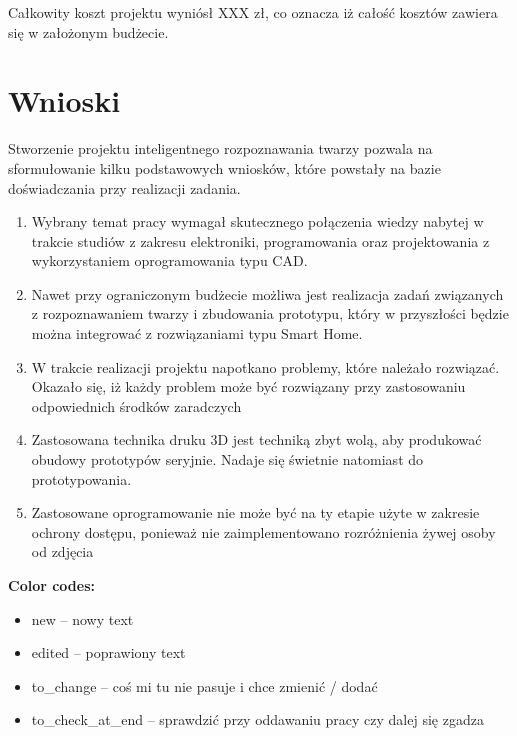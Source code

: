 \documentclass[a4paper,12pt,reqno]{article}
\begin{document}
Całkowity koszt projektu wyniósł \textcolor{to_check_at_end}{XXX} zł, co oznacza iż całość kosztów zawiera się w założonym budżecie.

\newpage
\section{Wnioski} \label{section:wnioski}
Stworzenie projektu inteligentnego rozpoznawania twarzy pozwala na sformułowanie kilku podstawowych wniosków, które powstały na bazie doświadczania przy realizacji zadania.

\begin{enumerate}
\item Wybrany temat pracy wymagał skutecznego połączenia wiedzy nabytej w trakcie studiów z zakresu elektroniki, programowania oraz projektowania z wykorzystaniem oprogramowania typu CAD.
\item Nawet przy ograniczonym budżecie możliwa jest realizacja zadań związanych z rozpoznawaniem twarzy i zbudowania prototypu, który w przyszłości będzie można integrować z rozwiązaniami typu Smart Home.
\item W trakcie realizacji projektu napotkano problemy, które należało rozwiązać. Okazało się, iż każdy problem może być rozwiązany przy zastosowaniu odpowiednich środków zaradczych
\item Zastosowana technika druku 3D jest techniką zbyt wolą, aby produkować obudowy prototypów seryjnie. Nadaje się świetnie natomiast do prototypowania.
\item Zastosowane oprogramowanie nie może być na ty etapie użyte w zakresie ochrony dostępu, ponieważ nie zaimplementowano rozróżnienia żywej osoby od zdjęcia
\end{enumerate}

\newpage




\newpage

\cite{prototyp3dzalety}
\cite{watki_jak_pisac}
\cite{funkcje_opakowan_01}
\cite{funkcje_opakowan_02}
\cite{face_recognition_with_python}
\cite{face_recognition_github}
\cite{face_recognition_python}
\cite{face_recognition_with_python}
\cite{face_detection_and_recognition_using_opencv}
\cite{face_recognition_implementation_on_raspberrypi}
\cite{how_to_setup_ender3}
\cite{jakie_materialy_w_druku}
\cite{jak_wybrac_tworzywo_do_drukarek}
\cite{opakowanie}

\bf{Color codes:}
\begin{itemize}
\item \textcolor{new}{new} – nowy text
\item \textcolor{edited}{edited} – poprawiony text
\item \textcolor{to_change}{to\_change} – coś mi tu nie pasuje i chce zmienić / dodać
\item \textcolor{to_check_at_end}{to\_check\_at\_end} – sprawdzić przy oddawaniu pracy czy dalej się zgadza
\end{itemize}
\end{document}
